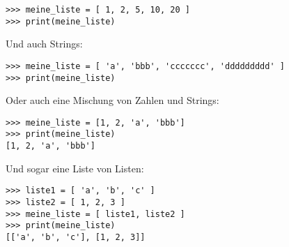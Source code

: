 \begin{Verbatim}[frame=single]
>>> meine_liste = [ 1, 2, 5, 10, 20 ]
>>> print(meine_liste)
\end{Verbatim}

\noindent
Und auch Strings:

\begin{Verbatim}[frame=single]
>>> meine_liste = [ 'a', 'bbb', 'ccccccc', 'ddddddddd' ]
>>> print(meine_liste)
\end{Verbatim}

\noindent
Oder auch eine Mischung von Zahlen und Strings:

\begin{Verbatim}[frame=single]
>>> meine_liste = [1, 2, 'a', 'bbb']
>>> print(meine_liste)
[1, 2, 'a', 'bbb']
\end{Verbatim}

\noindent
Und sogar eine Liste von Listen:

\begin{Verbatim}[frame=single]
>>> liste1 = [ 'a', 'b', 'c' ]
>>> liste2 = [ 1, 2, 3 ]
>>> meine_liste = [ liste1, liste2 ]
>>> print(meine_liste)
[['a', 'b', 'c'], [1, 2, 3]]
\end{Verbatim}

